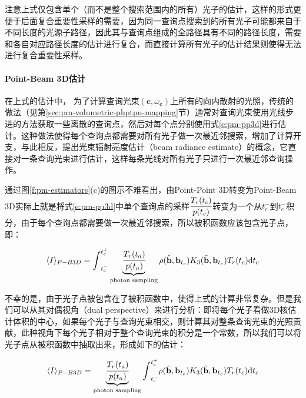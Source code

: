注意上式仅包含单个（而不是整个搜索范围内的所有）光子的估计，这样的形式更便于后面复合重要性采样的需要，因为同一查询点搜索到的所有光子可能都来自于不同长度的光源子路径，因此其与查询点组成的全路径具有不同的路径长度，需要和各自对应路径长度的估计进行复合，而直接计算所有光子的估计结果则使得无法进行复合重要性采样。




\paragraph{Point-Beam 3D估计}
在上式的估计中， 为了计算查询光束$(\mathbf{c},\omega_{\mathbf{c}})$上所有的向内散射的光照，传统的做法（见第\ref{sec:pm-volumetric-phptpn-mapping}节）通常对查询光束使用光线步进的方法获取一些离散的查询点，然后对每个点分别使用式\ref{e:pm-pp3d}进行估计。这种做法使得每个查询点都需要对所有光子做一次最近邻搜索，增加了计算开支，与此相反，\cite{a:TheBeamRadianceEstimateforVolumetricPhotonMapping}提出光束辐射亮度估计（beam radiance estimate）的概念，它直接对一条查询光束进行估计，这样每条光线对所有光子只进行一次最近邻查询操作。

通过图\ref{f:pm-estimators}(c)的图示不难看出，由Point-Point 3D转变为Point-Beam 3D实际上就是将式\ref{e:pm-pp3d}中单个查询点的采样$ \cfrac{T_r(t_c)}{p(t_c)}$转变为一个从$t^{-}_c$到$t^{-}_c$积分，由于每个查询点都需要做一次最近邻搜索，所以被积函数应该包含光子点，即：

\begin{equation*}
	\langle I\rangle_{P-B3D}={\rm \int}^{t^{+}_{c}}_{t^{-}_{c}}\underbrace{ \cfrac{T_r(t_a)}{p(t_a)}}_{\text{photon sampling}}\rho(\tilde{\mathbf{b}},\mathbf{b}_{t_c})K_3(\tilde{\mathbf{b}},\mathbf{b}_{t_c})T_r(t_c){\rm d}t_c
\end{equation*}

不幸的是，由于光子点被包含在了被积函数中，使得上式的计算非常复杂。但是我们可以从其对偶视角（dual perspective）来进行分析：即将每个光子看做3D核估计体积的中心，如果每个光子与查询光束相交，则计算其对整条查询光束的光照贡献，此种视角下每个光子相对于整个查询光束的积分是一个常数，所以我们可以将光子点从被积函数中抽取出来，形成如下的估计：

\begin{equation}\label{e:pm-pb3d}
	\langle I\rangle_{P-B3D}=\underbrace{ \cfrac{T_r(t_a)}{p(t_a)}}_{\text{photon sampling}}{\rm \int}^{t^{+}_{c}}_{t^{-}_{c}}\rho(\tilde{\mathbf{b}},\mathbf{b}_{t_c})K_3(\tilde{\mathbf{b}},\mathbf{b}_{t_c})T_r(t_c){\rm d}t_c
\end{equation}

